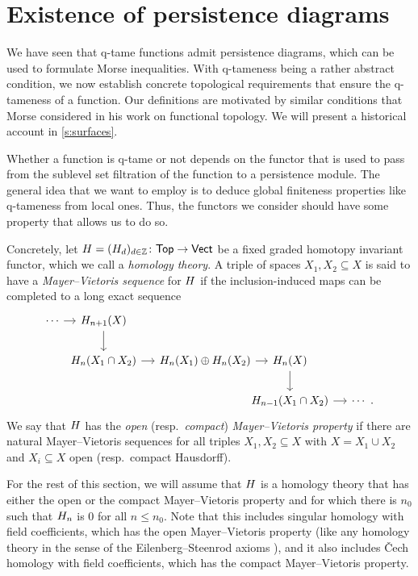 
\section{Existence of persistence diagrams} \label{s:connectivity}

We have seen that q-tame functions admit persistence diagrams, which can be used to formulate Morse inequalities.
With q-tameness being a rather abstract condition, we now establish concrete topological requirements that ensure the q-tameness of a function.
Our definitions are motivated by similar conditions that Morse considered in his work on functional topology.
We will present a historical account in \cref{s:surfaces}.

Whether a function is q-tame or not depends on the functor that is used to pass from the sublevel set filtration of the function to a persistence module.
The general idea that we want to employ is to deduce global finiteness properties like q-tameness from local ones.
Thus, the functors we consider should have some property that allows us to do so.

Concretely, let $H = (H_d)_{d \in \mathbb{Z}} \colon \mathsf{Top} \to \mathsf{Vect}$ be a fixed graded homotopy invariant functor, which we call a \emph{homology theory}.
A triple of spaces $X_{1}, X_{2} \subseteq X$ is said to have a \emph{Mayer--Vietoris sequence} for $H$ if the inclusion-induced maps can be completed to a long exact sequence
\begin{equation*}
\begin{tikzcd}[column sep = small]
\cdots \arrow[r] &[-10pt] \H_{n+1}(X) \arrow[d] & &[-20pt] & \\
& \H_{n}(X_{1} \cap X_{2}) \arrow[r] &
\H_{n}(X_{1}) \oplus \H_{n}(X_{2}) \arrow[r] &
\H_{n}(X) \arrow[d] \\ & & &
\H_{n-1}(X_{1} \cap X_{2}) \arrow[r] &
\cdots \ .
\end{tikzcd}
\end{equation*}
We say that $H$ has the \emph{open} (resp.\@\ \emph{compact}) \emph{Mayer--Vietoris property} if there are natural Mayer--Vietoris sequences for all triples $X_{1}, X_{2} \subseteq X$ with $X = X_1 \cup X_2$ and $X_i \subseteq X$ open (resp.\@\ compact Hausdorff).

For the rest of this section, we will assume that $H$ is a homology theory that has either the open or the compact Mayer--Vietoris property and for which there is $n_0$ such that $H_{n}$ is 0 for all $n \leq n_0$.
Note that this includes singular homology with field coefficients, which has the open Mayer--Vietoris property (like any homology theory in the sense of the Eilenberg--Steenrod axioms \cite[Section I]{Eilenberg.1952}), and it also includes \v{C}ech homology with field coefficients, which has the compact Mayer--Vietoris property.

